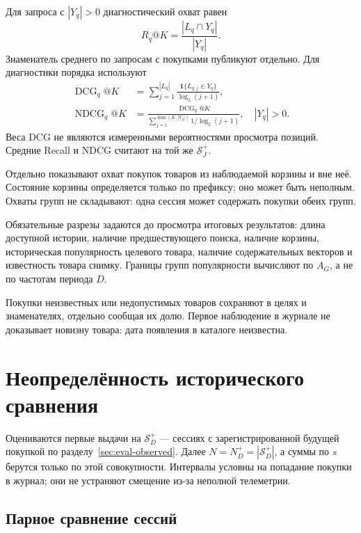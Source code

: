 \documentclass[12pt,a4paper]{article}
\newcommand{\ind}{\mathbf 1}
\theoremstyle{plainru}
\begin{document}
Для запроса с $|Y_q|>0$ диагностический охват равен
\begin{equation}\label{eq:eval-request-recall}
 R_q@K=\frac{|L_q\cap Y_q|}{|Y_q|}.
\end{equation}
Знаменатель среднего по запросам с покупками публикуют отдельно.
Для диагностики порядка используют
\begin{align}
 \operatorname{DCG}_q@K
 &=\sum_{j=1}^{|L_q|}
       \frac{\ind\{L_{q,j}\in Y_q\}}{\log_2(j+1)},
 \label{eq:eval-dcg}\\
 \operatorname{NDCG}_q@K
 &=\frac{\operatorname{DCG}_q@K}
 {\displaystyle\sum_{j=1}^{\min(K,|Y_q|)}1/\log_2(j+1)},
 \quad |Y_q|>0.
 \label{eq:eval-ndcg}
\end{align}
Веса DCG не являются измеренными вероятностями просмотра позиций.
Средние Recall и NDCG считают на той же $\mathcal S_J^+$.

Отдельно показывают охват покупок товаров из наблюдаемой корзины
и вне неё. Состояние корзины определяется только по префиксу;
оно может быть неполным. Охваты групп не складывают: одна сессия
может содержать покупки обеих групп.

Обязательные разрезы задаются до просмотра итоговых результатов:
длина доступной истории, наличие предшествующего поиска,
наличие корзины, историческая популярность целевого товара,
наличие содержательных векторов и известность товара снимку.
Границы групп популярности вычисляют по $A_G$, а не по частотам периода $D$.

Покупки неизвестных или недопустимых товаров сохраняют в целях
и знаменателях, отдельно сообщая их долю. Первое наблюдение в журнале
не доказывает новизну товара: дата появления в каталоге неизвестна.

\section{Неопределённость исторического сравнения}
\label{sec:eval-uncertainty}

Оцениваются первые выдачи на $\mathcal S_D^+$ --- сессиях с зарегистрированной
будущей покупкой по разделу~\ref{sec:eval-observed}. Далее $N=N_D^+=|\mathcal S_D^+|$,
а суммы по $s$ берутся только по этой совокупности. Интервалы условны на попадание
покупки в журнал; они не устраняют смещение из-за неполной телеметрии.

\subsection{Парное сравнение сессий}\label{sec:eval-paired}
\end{document}
